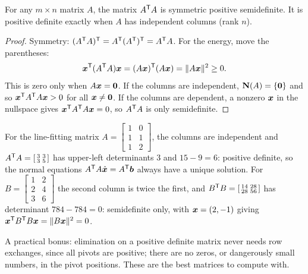 \begin{theorem}\label{thm:u32-ata}
For any $m\times n$ matrix $A$, the matrix $A^{\mathsf{T}} A$ is symmetric positive semidefinite. It is
positive definite exactly when $A$ has independent columns (rank $n$).
\end{theorem}
\begin{proof}
Symmetry: $(A^{\mathsf{T}} A)^{\mathsf{T}}=A^{\mathsf{T}}(A^{\mathsf{T}})^{\mathsf{T}}=A^{\mathsf{T}} A$. For the energy, move the parentheses:
\[
  \boldsymbol{x}^{\mathsf{T}}(A^{\mathsf{T}} A)\boldsymbol{x}=(A\boldsymbol{x})^{\mathsf{T}}(A\boldsymbol{x})=\|A\boldsymbol{x}\|^2\ge0 .
\]
This is zero only when $A\boldsymbol{x}=\boldsymbol{0}$. If the columns are independent, $\mathbf{N}(A)=\{\boldsymbol{0}\}$ and so
$\boldsymbol{x}^{\mathsf{T}} A^{\mathsf{T}} A\boldsymbol{x}>0$ for all $\boldsymbol{x}\ne\boldsymbol{0}$. If the columns are dependent, a nonzero $\boldsymbol{x}$ in the
nullspace gives $\boldsymbol{x}^{\mathsf{T}} A^{\mathsf{T}} A\boldsymbol{x}=0$, so $A^{\mathsf{T}} A$ is only semidefinite.
\end{proof}

\begin{example}\label{ex:u32-ata}
For the line-fitting matrix $A=\left[\begin{smallmatrix}1&0\\1&1\\1&2\end{smallmatrix}\right]$, the columns
are independent and $A^{\mathsf{T}} A=\left[\begin{smallmatrix}3&3\\3&5\end{smallmatrix}\right]$ has upper-left
determinants $3$ and $15-9=6$: positive definite, so the normal equations $A^{\mathsf{T}} A\hat{\boldsymbol{x}}=A^{\mathsf{T}}\boldsymbol{b}$
always have a unique solution. For $B=\left[\begin{smallmatrix}1&2\\2&4\\3&6\end{smallmatrix}\right]$ the
second column is twice the first, and $B^{\mathsf{T}} B=\left[\begin{smallmatrix}14&28\\28&56\end{smallmatrix}\right]$
has determinant $784-784=0$: semidefinite only, with $\boldsymbol{x}=(2,-1)$ giving
$\boldsymbol{x}^{\mathsf{T}} B^{\mathsf{T}} B\boldsymbol{x}=\|B\boldsymbol{x}\|^2=0$.
\end{example}

A practical bonus: elimination on a positive definite matrix never needs row exchanges, since
all pivots are positive; there are no zeros, or dangerously small numbers, in the pivot
positions. These are the best matrices to compute with.

